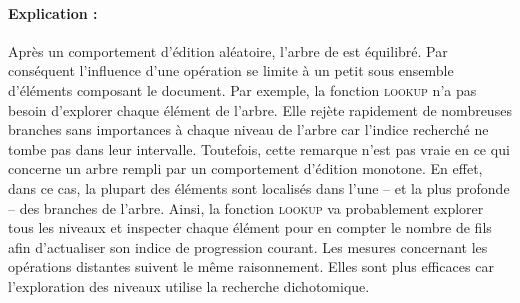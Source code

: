 \paragraph{Explication :} Après un comportement d'édition aléatoire, l'arbre de
\LSEQ est équilibré. Par conséquent l'influence d'une opération se limite à un
petit sous ensemble d'éléments composant le document. Par exemple, la fonction
\textsc{lookup} n'a pas besoin d'explorer chaque élément de l'arbre. Elle rejète
rapidement de nombreuses branches sans importances à chaque niveau de l'arbre
car l'indice recherché ne tombe pas dans leur intervalle. Toutefois, cette
remarque n'est pas vraie en ce qui concerne un arbre rempli par un comportement
d'édition monotone. En effet, dans ce cas, la plupart des éléments sont
localisés dans l'une -- et la plus profonde -- des branches de l'arbre. Ainsi,
la fonction \textsc{lookup} va probablement explorer tous les niveaux et
inspecter chaque élément pour en compter le nombre de fils afin d'actualiser son
indice de progression courant. Les mesures concernant les opérations distantes
suivent le même raisonnement. Elles sont plus efficaces car l'exploration des
niveaux utilise la recherche dichotomique.

